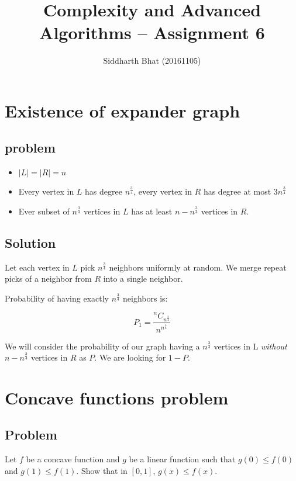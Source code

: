 \documentclass{article}
\author{Siddharth Bhat (20161105)}
\title{Complexity and Advanced Algorithms -- Assignment 6}
\newcommand*{\Comb}[2]{{}^{#1}C_{#2}}%
\begin{document}
\newcommand{\threesat}{\texttt{3-SAT}~}
\newcommand{\pspace}{\texttt{PSPACE}~}
\newcommand{\np}{\texttt{NP}~}
\newcommand{\nat}{\mathbb{N}~}
\newcommand{\pred}{\mathbb{P}~}
\newcommand{\logspace}{\texttt{LOGSPACE}~}
\newcommand{\nlogspace}{\texttt{NLOGSPACE}~}
\newcommand{\ptime}{\texttt{P}~}
\newcommand{\nptime}{\texttt{NP}~}
\newcommand{\E}[1]{\mathbb{E}\big[ #1 \big]}
\newcommand{\prob}[1]{\mathbb{P}\bigg[ #1 \bigg]}
\maketitle

\section{Existence of expander graph}
 \subsection{problem}
\begin{itemize}
\item $|L| = |R| = n$
\item Every vertex in $L$ has degree $n^\frac{3}{4}$, every vertex in
 $R$ has degree at most $3n^\frac{3}{4}$
 \item Ever subset of $n^\frac{3}{4}$ vertices in $L$ has at least
 $n - n^\frac{3}{4}$ vertices in $R$.
\end{itemize}
 \subsection{Solution}

Let each vertex in $L$ pick $n^\frac{3}{4}$ neighbors uniformly at random. We merge
repeat picks of a neighbor from $R$ into a single neighbor.


Probability of having exactly $n^\frac{3}{4}$ neighbors is:

$$
P_1 = \frac{
	\Comb{n}{n^\frac{3}{4}}
}{
	n^{n^\frac{3}{4}}
}
$$

We will consider the probability of our graph having a $n^\frac{3}{4}$ vertices
in L \textit{without} $n - n^\frac{3}{4}$ vertices in $R$ as $P$. We are
looking for $1 - P$.



 \section{Concave functions problem}
 \subsection{Problem}
 Let $f$ be a concave function and $g$ be a linear function such that
 $g(0) \leq f(0)$ and $g(1) \leq f(1)$. Show that in $[0, 1]$, $g(x) \leq f(x)$.
\end{document}
